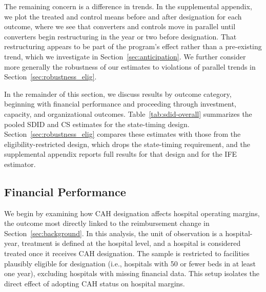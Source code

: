 \documentclass[a4paper, 12pt, twoside]{article}
\begin{document}
The remaining concern is a difference in trends. In the supplemental appendix, we plot the treated and control means before and after designation for each outcome, where we see that converters and controls move in parallel until converters begin restructuring in the year or two before designation. That restructuring appears to be part of the program's effect rather than a pre-existing trend, which we investigate in Section~\ref{sec:anticipation}. We further consider more generally the robustness of our estimates to violations of parallel trends in Section~\ref{sec:robustness_elig}.

In the remainder of this section, we discuss results by outcome category, beginning with financial performance and proceeding through investment, capacity, and organizational outcomes. Table~\ref{tab:sdid-overall} summarizes the pooled SDID and CS estimates for the state-timing design. Section~\ref{sec:robustness_elig} compares these estimates with those from the eligibility-restricted design, which drops the state-timing requirement, and the supplemental appendix reports full results for that design and for the IFE estimator.

\subsection{Financial Performance}
\label{sec:financial}

We begin by examining how CAH designation affects hospital operating margins, the outcome most directly linked to the reimbursement change in Section~\ref{sec:background}. In this analysis, the unit of observation is a hospital-year, treatment is defined at the hospital level, and a hospital is considered treated once it receives CAH designation. The sample is restricted to facilities plausibly eligible for designation (i.e., hospitals with 50 or fewer beds in at least one year), excluding hospitals with missing financial data. This setup isolates the direct effect of adopting CAH status on hospital margins.
\end{document}
